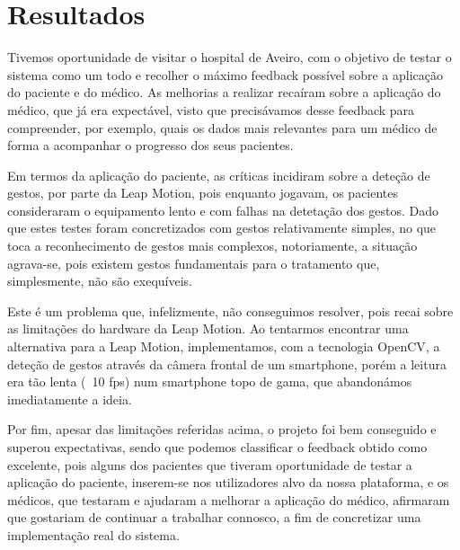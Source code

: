 \documentclass{TTUPhD}
\begin{document}

\section{Resultados}

Tivemos oportunidade de visitar o hospital de Aveiro, com o objetivo de testar o sistema como um todo e recolher o máximo feedback possível sobre a aplicação do paciente e do médico. As melhorias a realizar recaíram sobre a aplicação do médico, que já era expectável, visto que precisávamos desse feedback para compreender, por exemplo, quais os dados mais relevantes para um médico de forma a acompanhar o progresso dos seus pacientes.

Em termos da aplicação do paciente, as críticas incidiram sobre a deteção de gestos, por parte da Leap Motion, pois enquanto jogavam, os pacientes consideraram o equipamento lento e com falhas na detetação dos gestos. Dado que estes testes foram concretizados com gestos relativamente simples, no que toca a reconhecimento de gestos mais complexos, notoriamente, a situação agrava-se, pois existem gestos fundamentais para o tratamento que, simplesmente, não são exequíveis.

Este é um problema que, infelizmente, não conseguimos resolver, pois recai sobre as limitações do hardware da Leap Motion. Ao tentarmos encontrar uma alternativa para a Leap Motion, implementamos, com a tecnologia OpenCV, a deteção de gestos através da câmera frontal de um smartphone, porém a leitura era tão lenta (~10 fps) num smartphone topo de gama, que abandonámos imediatamente a ideia.

Por fim, apesar das limitações referidas acima, o projeto foi bem conseguido e superou expectativas, sendo que podemos classificar o feedback obtido como excelente, pois alguns dos pacientes que tiveram oportunidade de testar a aplicação do paciente, inserem-se nos utilizadores alvo da nossa plataforma, e os médicos, que testaram e ajudaram a melhorar a aplicação do médico, afirmaram que gostariam de continuar a trabalhar connosco, a fim de concretizar uma implementação real do sistema.

\end{document}
